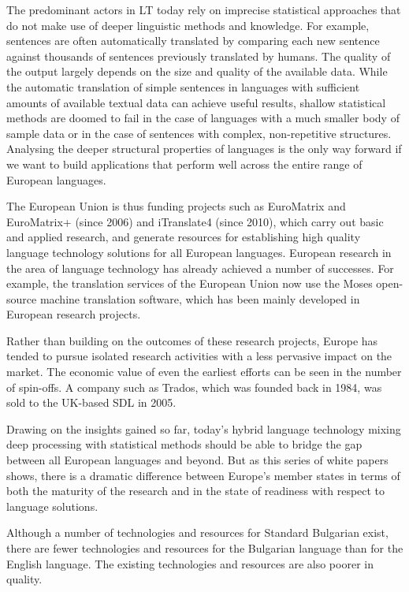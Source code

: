 \documentclass[]{../../metanetpaper}
\begin{document}
\begin{multicols}{2}
The predominant actors in LT today rely on imprecise statistical approaches that do not make use of deeper linguistic methods and knowledge. For example, sentences are often automatically translated by comparing each new sentence against thousands of sentences previously translated by humans. The quality of the output largely depends on the size and quality of the available  data. While the automatic translation of simple sentences in languages with sufficient amounts of available textual data can achieve useful results, shallow statistical methods are doomed to fail in the case of languages with a much smaller body of sample data or in the case of sentences with complex, non-repetitive structures. Analysing the deeper structural properties of languages is the only way forward if we want to build applications that perform well across the entire range of European languages.


The European Union is thus funding projects such as EuroMatrix and EuroMatrix+ (since 2006) and iTranslate4 (since 2010), which carry out basic and applied research, and generate resources for establishing high quality language technology solutions for all European languages. 
European research in the area of language technology has already achieved a number of successes. For example, the translation services of the European Union now use the Moses open-source machine translation software, which has been mainly developed in European research projects. 

Rather than building on the outcomes of these research projects, Europe has tended to pursue isolated research activities with a less pervasive impact on the market. The economic value of even the earliest efforts can be seen in the number of spin-offs. A company such as Trados, which was founded back in 1984, was sold to the UK-based SDL in 2005.


Drawing on the insights gained so far, today’s hybrid language technology mixing deep processing with statistical methods should be able to bridge the gap between all European languages and beyond. But as this series of white papers shows, there is a dramatic difference between Europe’s
member states in terms of both the maturity of the research and in the state of readiness with respect to language solutions.
 
Although a number of technologies and resources for Standard Bulgarian exist, there are fewer technologies and resources for the Bulgarian language than for the English language. The existing technologies and resources are also poorer in quality.


\end{multicols}
\end{document}
